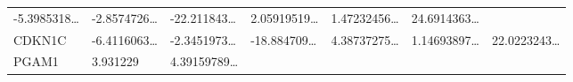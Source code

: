 \documentclass[
]{article}
\begin{document}
\begin{longtable}[]{@{}lllllll@{}}
\begin{minipage}[t]{0.12\columnwidth}
-5.3985318\ldots{}\strut
\end{minipage} & \begin{minipage}[t]{0.12\columnwidth}\raggedright
-2.8574726\ldots{}\strut
\end{minipage} & \begin{minipage}[t]{0.12\columnwidth}\raggedright
-22.211843\ldots{}\strut
\end{minipage} & \begin{minipage}[t]{0.12\columnwidth}\raggedright
2.05919519\ldots{}\strut
\end{minipage} & \begin{minipage}[t]{0.12\columnwidth}\raggedright
1.47232456\ldots{}\strut
\end{minipage} & \begin{minipage}[t]{0.12\columnwidth}\raggedright
24.6914363\ldots{}\strut
\end{minipage}\tabularnewline
\begin{minipage}[t]{0.08\columnwidth}\raggedright
CDKN1C\strut
\end{minipage} & \begin{minipage}[t]{0.12\columnwidth}\raggedright
-6.4116063\ldots{}\strut
\end{minipage} & \begin{minipage}[t]{0.12\columnwidth}\raggedright
-2.3451973\ldots{}\strut
\end{minipage} & \begin{minipage}[t]{0.12\columnwidth}\raggedright
-18.884709\ldots{}\strut
\end{minipage} & \begin{minipage}[t]{0.12\columnwidth}\raggedright
4.38737275\ldots{}\strut
\end{minipage} & \begin{minipage}[t]{0.12\columnwidth}\raggedright
1.14693897\ldots{}\strut
\end{minipage} & \begin{minipage}[t]{0.12\columnwidth}\raggedright
22.0223243\ldots{}\strut
\end{minipage}\tabularnewline
\begin{minipage}[t]{0.08\columnwidth}\raggedright
PGAM1\strut
\end{minipage} & \begin{minipage}[t]{0.12\columnwidth}\raggedright
3.931229\strut
\end{minipage} & \begin{minipage}[t]{0.12\columnwidth}\raggedright
4.39159789\ldots{}\strut
\end{minipage} & \begin{minipage}[t]{0.12\columnwidth}\raggedright

\end{minipage}
\end{longtable}
\end{document}
